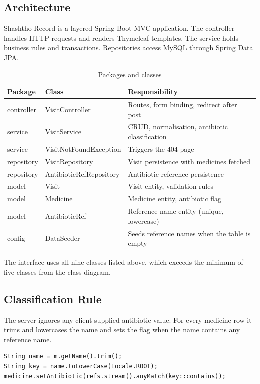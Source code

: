 \documentclass[11pt,a4paper]{article}
\begin{document}
\subsection{Architecture}
Shashtho Record is a layered Spring Boot MVC application. The controller handles HTTP requests and renders Thymeleaf templates. The service holds business rules and transactions. Repositories access MySQL through Spring Data JPA.

\begin{table}[H]
\centering
\caption{Packages and classes}
\begin{tabularx}{\textwidth}{llY}
\toprule
\textbf{Package} & \textbf{Class} & \textbf{Responsibility}\\
\midrule
controller & VisitController & Routes, form binding, redirect after post\\
service & VisitService & CRUD, normalisation, antibiotic classification\\
service & VisitNotFoundException & Triggers the 404 page\\
repository & VisitRepository & Visit persistence with medicines fetched\\
repository & AntibioticRefRepository & Antibiotic reference persistence\\
model & Visit & Visit entity, validation rules\\
model & Medicine & Medicine entity, antibiotic flag\\
model & AntibioticRef & Reference name entity (unique, lowercase)\\
config & DataSeeder & Seeds reference names when the table is empty\\
\bottomrule
\end{tabularx}
\end{table}
The interface uses all nine classes listed above, which exceeds the minimum of five classes from the class diagram.

\subsection{Classification Rule}
The server ignores any client-supplied antibiotic value. For every medicine row it trims and lowercases the name and sets the flag when the name contains any reference name.

\begin{lstlisting}
String name = m.getName().trim();
String key = name.toLowerCase(Locale.ROOT);
medicine.setAntibiotic(refs.stream().anyMatch(key::contains));
\end{lstlisting}
\end{document}
